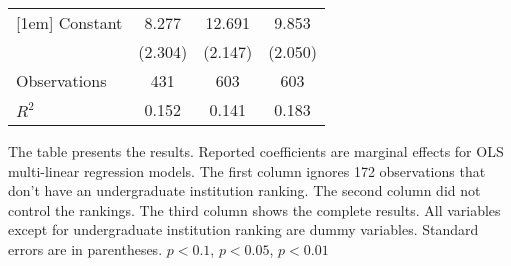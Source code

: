 \begin{table}[htbp]
{\begin{tabular}{l*{3}{c}}
[1em]
Constant            &       8.277\sym{***}&      12.691\sym{***}&       9.853\sym{***}\\
                    &     (2.304)         &     (2.147)         &     (2.050)         \\
\hline
Observations        &         431         &         603         &         603         \\
\(R^{2}\)           &       0.152         &       0.141         &       0.183         \\
\hline\hline
\end{tabular}}
\vspace*{0.09cm}
\begin{minipage}{0.95\textwidth} 
{\footnotesize 
The table presents the results. Reported coefficients are marginal effects for OLS multi-linear regression models. The first column ignores 172 observations that don't have an undergraduate institution ranking. The second column did not control the rankings. The third column shows the complete results. All variables except for undergraduate institution ranking are dummy variables. Standard errors are in parentheses. \sym{*} \(p<0.1\), \sym{**} \(p<0.05\), \sym{***} \(p<0.01\)}
\end{minipage}

\end{table}